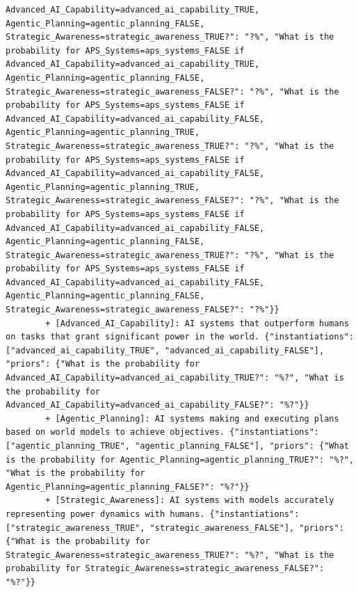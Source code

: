 \documentclass[
  11pt,
  letterpaper,
]{book}
\begin{document}
\begin{verbatim}
Advanced_AI_Capability=advanced_ai_capability_TRUE, Agentic_Planning=agentic_planning_FALSE, Strategic_Awareness=strategic_awareness_TRUE?": "?%", "What is the probability for APS_Systems=aps_systems_FALSE if Advanced_AI_Capability=advanced_ai_capability_TRUE, Agentic_Planning=agentic_planning_FALSE, Strategic_Awareness=strategic_awareness_FALSE?": "?%", "What is the probability for APS_Systems=aps_systems_FALSE if Advanced_AI_Capability=advanced_ai_capability_FALSE, Agentic_Planning=agentic_planning_TRUE, Strategic_Awareness=strategic_awareness_TRUE?": "?%", "What is the probability for APS_Systems=aps_systems_FALSE if Advanced_AI_Capability=advanced_ai_capability_FALSE, Agentic_Planning=agentic_planning_TRUE, Strategic_Awareness=strategic_awareness_FALSE?": "?%", "What is the probability for APS_Systems=aps_systems_FALSE if Advanced_AI_Capability=advanced_ai_capability_FALSE, Agentic_Planning=agentic_planning_FALSE, Strategic_Awareness=strategic_awareness_TRUE?": "?%", "What is the probability for APS_Systems=aps_systems_FALSE if Advanced_AI_Capability=advanced_ai_capability_FALSE, Agentic_Planning=agentic_planning_FALSE, Strategic_Awareness=strategic_awareness_FALSE?": "?%"}}
        + [Advanced_AI_Capability]: AI systems that outperform humans on tasks that grant significant power in the world. {"instantiations": ["advanced_ai_capability_TRUE", "advanced_ai_capability_FALSE"], "priors": {"What is the probability for Advanced_AI_Capability=advanced_ai_capability_TRUE?": "%?", "What is the probability for Advanced_AI_Capability=advanced_ai_capability_FALSE?": "%?"}}
        + [Agentic_Planning]: AI systems making and executing plans based on world models to achieve objectives. {"instantiations": ["agentic_planning_TRUE", "agentic_planning_FALSE"], "priors": {"What is the probability for Agentic_Planning=agentic_planning_TRUE?": "%?", "What is the probability for Agentic_Planning=agentic_planning_FALSE?": "%?"}}
        + [Strategic_Awareness]: AI systems with models accurately representing power dynamics with humans. {"instantiations": ["strategic_awareness_TRUE", "strategic_awareness_FALSE"], "priors": {"What is the probability for Strategic_Awareness=strategic_awareness_TRUE?": "%?", "What is the probability for Strategic_Awareness=strategic_awareness_FALSE?": "%?"}}

\end{verbatim}
\end{document}
